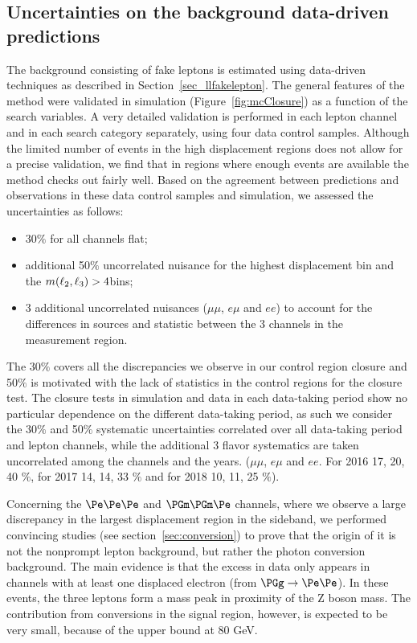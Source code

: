 \subsection{Uncertainties on the background data-driven predictions}
The background consisting of fake leptons is estimated
using data-driven techniques as described in
Section~\ref{sec_llfakelepton}. The general features of the method were
validated in simulation (Figure~\ref{fig:mcClosure}) as a function of
the search variables. A very detailed validation is performed in each
lepton channel and in each search category separately, using
four data control samples. Although the limited number of events in
the high displacement regions does not allow for a precise validation,
we find that in regions where enough events are available the method
checks out fairly well. 
Based on the agreement between predictions and observations in these
data control samples and simulation, we assessed the uncertainties as
follows:
\begin{itemize}
\setlength\itemsep{-0.2em}
\item 30$\%$ for all channels flat;
\item additional 50$\%$ uncorrelated nuisance for the highest displacement bin and the $m(\ell_2,\ell_3) > 4$\GeV bins;
\item 3 additional uncorrelated nuisances ($\mu\mu$, $e\mu$ and $ee$) to account for the differences in sources and statistic between the 3 channels in the \Dfr measurement region.
\end{itemize}
The 30$\%$ covers all the discrepancies we observe in our control region closure and 50$\%$ is motivated with the lack of statistics in the control regions for the closure test. 
The closure tests in simulation and data in each data-taking period
show no particular dependence on the different data-taking period, as such we consider the 30$\%$ and 50$\%$ systematic uncertainties correlated over all data-taking period and lepton channels, while the additional 3 flavor systematics are taken uncorrelated among the channels and the years. ($\mu\mu$, $e\mu$ and $ee$. For 2016 17, 20, 40 $\%$, for 2017 14, 14, 33 $\%$ and for 2018 10, 11, 25 $\%$).

Concerning the $\Pe\Pe\Pe$ and $\PGm\PGm\Pe$ channels, where we observe
a large discrepancy in the largest displacement region in the
sideband, we performed convincing studies (see
section~\ref{sec:conversion}) to prove that the origin of it is not
the nonprompt lepton background, but rather the photon conversion
background.
The main evidence is that the excess in data only appears in channels
with at least one displaced electron (from $\PGg\to\Pe\Pe$).
In these events, the three leptons form a mass peak in proximity of the Z boson
mass. The contribution from conversions in the signal region, however,
is expected to be very small, because of the \mlll upper bound at 80 GeV.

